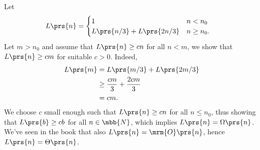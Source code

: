 \documentclass[oneside]{scrbook}
\theoremstyle{definition}
\begin{document}
\begin{exercise}
    Let
    \begin{align*}
        L\prs{n} &=
        \begin{cases}
            1 & n < n_0 \\
            L\prs{n/3} + L\prs{2n/3} & n \geq n_0 \text{.}
        \end{cases}
    \end{align*}
    Let $m > n_0$ and assume that $L\prs{n} \geq c n$ for all $n < m$, we show that $L\prs{n} \geq c m$ for suitable $c>0$.
    Indeed,
    \begin{align*}
        L\prs{m} &= L\prs{m/3} + L\prs{2m/3}
        \\&\geq \frac{cm}{3} + \frac{2cm}{3}
        \\&= cm \text{.}
    \end{align*}
    We choose $c$ small enough such that $L\prs{n} \geq cn$ for all $n \leq n_0$, thus showing that $L\prs{b} \geq cb$ for all $n \in \mbb{N}$, which implies $L\prs{n} = \Omega\prs{n}$. We've seen in the book that also $L\prs{n} = \mrm{O}\prs{n}$, hence $L\prs{n} = \Theta\prs{n}$.
\end{exercise}
\end{document}
